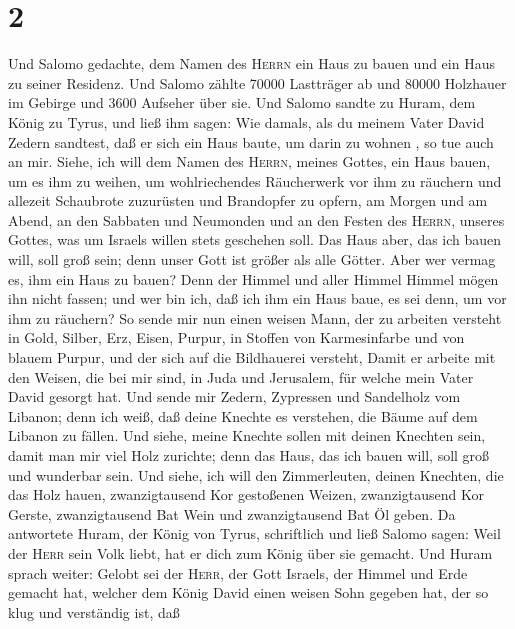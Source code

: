 \hypertarget{section-1}{%
\section{2}\label{section-1}}

 Und Salomo gedachte, dem Namen des \textsc{Herrn} ein
Haus zu bauen und ein Haus zu seiner Residenz.  Und Salomo
zählte 70000 Lastträger ab und 80000 Holzhauer im Gebirge und 3600
Aufseher über sie.  Und Salomo sandte zu Huram, dem König
zu Tyrus, und ließ ihm sagen: Wie damals, als du meinem Vater David
Zedern sandtest, daß er sich ein Haus baute, um darin zu wohnen , so tue
auch an mir.  Siehe, ich will dem Namen des
\textsc{Herrn}, meines Gottes, ein Haus bauen, um es ihm zu weihen, um
wohlriechendes Räucherwerk vor ihm zu räuchern und allezeit Schaubrote
zuzurüsten und Brandopfer zu opfern, am Morgen und am Abend, an den
Sabbaten und Neumonden und an den Festen des \textsc{Herrn}, unseres
Gottes, was um Israels willen stets geschehen soll.  Das
Haus aber, das ich bauen will, soll groß sein; denn unser Gott ist
größer als alle Götter.  Aber wer vermag es, ihm ein Haus
zu bauen? Denn der Himmel und aller Himmel Himmel mögen ihn nicht
fassen; und wer bin ich, daß ich ihm ein Haus baue, es sei denn, um vor
ihm zu räuchern?  So sende mir nun einen weisen Mann, der
zu arbeiten versteht in Gold, Silber, Erz, Eisen, Purpur, in Stoffen von
Karmesinfarbe und von blauem Purpur, und der sich auf die Bildhauerei
versteht, Damit er arbeite mit den Weisen, die bei mir sind, in Juda und
Jerusalem, für welche mein Vater David gesorgt hat.  Und
sende mir Zedern, Zypressen und Sandelholz vom Libanon; denn ich weiß,
daß deine Knechte es verstehen, die Bäume auf dem Libanon zu fällen. Und
siehe, meine Knechte sollen mit deinen Knechten sein, 
damit man mir viel Holz zurichte; denn das Haus, das ich bauen will,
soll groß und wunderbar sein.  Und siehe, ich will den
Zimmerleuten, deinen Knechten, die das Holz hauen, zwanzigtausend Kor
gestoßenen Weizen, zwanzigtausend Kor Gerste, zwanzigtausend Bat Wein
und zwanzigtausend Bat Öl geben.  Da antwortete Huram,
der König von Tyrus, schriftlich und ließ Salomo sagen: Weil der
\textsc{Herr} sein Volk liebt, hat er dich zum König über sie gemacht.
 Und Huram sprach weiter: Gelobt sei der \textsc{Herr},
der Gott Israels, der Himmel und Erde gemacht hat, welcher dem König
David einen weisen Sohn gegeben hat, der so klug und verständig ist, daß
